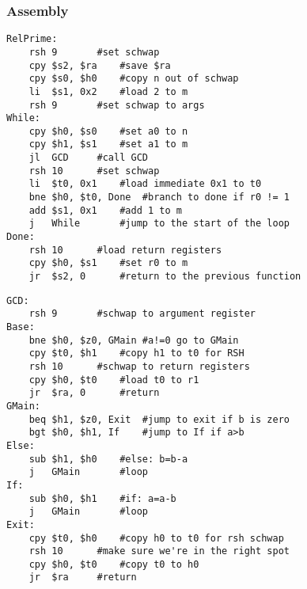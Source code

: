 \documentclass{article}
\begin{document}
		\subsubsection{Assembly}
			\begin{lstlisting}[frame=single]
RelPrime:
	rsh	9		#set schwap
	cpy	$s2, $ra	#save $ra
	cpy	$s0, $h0	#copy n out of schwap
	li	$s1, 0x2	#load 2 to m
	rsh	9		#set schwap to args
While:
	cpy	$h0, $s0	#set a0 to n
	cpy	$h1, $s1	#set a1 to m
	jl	GCD		#call GCD
	rsh	10		#set schwap
	li	$t0, 0x1	#load immediate 0x1 to t0
	bne	$h0, $t0, Done	#branch to done if r0 != 1
	add	$s1, 0x1	#add 1 to m
	j	While		#jump to the start of the loop
Done:
	rsh	10		#load return registers
	cpy	$h0, $s1	#set r0 to m
	jr	$s2, 0		#return to the previous function
			\end{lstlisting}
			\begin{lstlisting}[frame=single]
GCD:
	rsh	9		#schwap to argument register
Base:
	bne	$h0, $z0, GMain	#a!=0 go to GMain
	cpy	$t0, $h1	#copy h1 to t0 for RSH
	rsh	10		#schwap to return registers
	cpy	$h0, $t0	#load t0 to r1
	jr	$ra, 0		#return
GMain:
	beq	$h1, $z0, Exit	#jump to exit if b is zero
	bgt	$h0, $h1, If	#jump to If if a>b
Else:
	sub	$h1, $h0	#else: b=b-a
	j	GMain		#loop
If:
	sub	$h0, $h1	#if: a=a-b
	j	GMain		#loop
Exit:
	cpy	$t0, $h0	#copy h0 to t0 for rsh schwap
	rsh	10		#make sure we're in the right spot
	cpy	$h0, $t0	#copy t0 to h0
	jr	$ra		#return
			\end{lstlisting}
\end{document}
